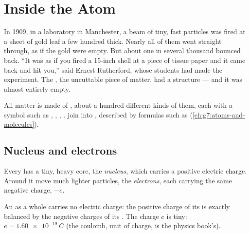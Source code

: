 \chapter{Inside the Atom}\label{ch:g9:inside-the-atom}

In 1909, in a laboratory in Manchester, a beam of tiny, fast particles
was fired at a sheet of gold leaf a few hundred  thick. Nearly all
of them went straight through, as if the gold were empty. But about one
in several thousand bounced back. ``It was as if you fired a 15-inch
shell at a piece of tissue paper and it came back and hit you,'' said
Ernest Rutherford, whose students had made the experiment. The ,
the uncuttable piece of matter, had a structure --- and it was almost
entirely empty.

\begin{recall}
All matter is made of , about a hundred different kinds of them,
each with a symbol such as , , , .  join
into , described by formulas such as 
(\cref{ch:g7:atoms-and-molecules}).
\end{recall}

\section{Nucleus and electrons}

\begin{definition}\label{def:g9:inside-the-atom:nucleus}
Every  has a tiny, heavy core, the \emph{nucleus},
which carries a positive electric charge. Around it move much lighter
particles, the \emph{electrons}, each carrying the same
negative charge, $-e$.
\end{definition}

\begin{proposition}\label{prop:g9:inside-the-atom:neutral}
An  as a whole carries no electric charge: the positive charge of its
 is exactly balanced by the negative charges of its .
The charge $e$ is tiny: $e = \qty{1.60e-19}{C}$ (the coulomb, unit of
charge, is the physics book's).
\end{proposition}

